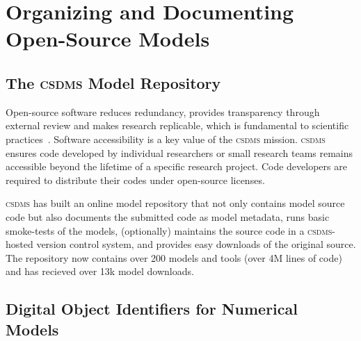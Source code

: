 \documentclass[11pt, oneside]{amsart}
\DeclareRobustCommand{\csdms}{\textsc{csdms}}
\begin{document}
\section{Organizing and Documenting Open-Source Models}
\label{sec:organizing}

\subsection{The \csdms{} Model Repository}
\label{sec:repository}

Open-source software reduces redundancy, provides transparency through
external review and makes research replicable, which is fundamental to
scientific practices~\cite{ince2012case}.
Software accessibility is a key value of the \csdms{} mission. \csdms{}
ensures code developed by individual researchers or small research teams
remains accessible beyond the lifetime of a specific research project. Code
developers are required to distribute their codes under open-source licenses. 

\csdms{} has built an online model repository that not only contains model
source code but also documents the submitted code as model metadata, runs
basic smoke-tests of the models, (optionally) maintains the source code in a
\csdms-hosted version control system, and provides easy downloads of the
original source. The repository now contains over 200 models and tools (over
4M lines of code) and has recieved over 13k model downloads.



\subsection{Digital Object Identifiers for Numerical Models}
\label{sec:doi}

\end{document}
